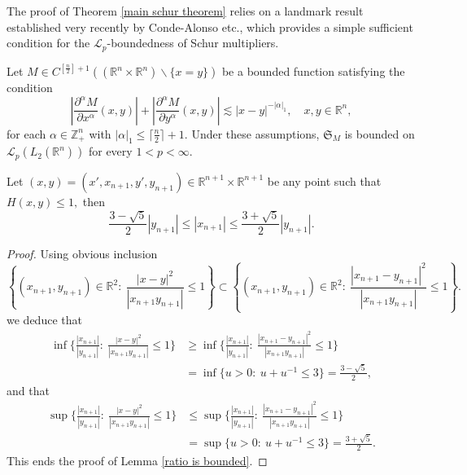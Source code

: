 \documentclass{amsart}
\begin{document}
The proof of Theorem \ref{main schur theorem} relies on a landmark result established very recently by Conde-Alonso etc., which provides a simple sufficient condition for the $\mathcal{L}_p$-boundedness of Schur multipliers.
\begin{theorem}\cite[Theorem A]{MR4660138}\label{Annalspaper}
Let $M\in C^{[\frac{n}{2}]+1}((\mathbb{R}^n\times\mathbb{R}^n)\backslash\{x=y\})$ be a bounded function satisfying the condition
$$\left|\frac{\partial^\alpha M}{\partial x^\alpha}(x,y)\right|+\left|\frac{\partial^\alpha M}{\partial y^\alpha}(x,y)\right|\lesssim |x-y|^{-|\alpha|_1},\quad x,y\in\mathbb{R}^n,$$
for each $\alpha\in\mathbb{Z}_+^n$ with $|\alpha|_1\leq \lceil\frac{n}{2}\rceil+1.$ Under these assumptions, $\mathfrak{S}_M$ is bounded on $\mathcal{L}_p(L_2(\mathbb{R}^n))$ for every $1<p<\infty.$
\end{theorem}

\begin{lemma}\label{ratio is bounded}
Let $(x,y)=(x',x_{n+1},y',y_{n+1})\in\mathbb{R}^{n+1}\times \mathbb{R}^{n+1}$ be any point such that $H(x,y)\leq 1,$ then
$$\frac{3-\sqrt{5}}{2}|y_{n+1}|\leq |x_{n+1}|\leq \frac{3+\sqrt{5}}{2}|y_{n+1}|.$$	
\end{lemma}
\begin{proof} Using obvious inclusion
$$\left\{(x_{n+1},y_{n+1})\in\mathbb{R}^2:\ \frac{|x-y|^2}{|x_{n+1}y_{n+1}|}\leq 1\right\}\subset \left\{(x_{n+1},y_{n+1})\in\mathbb{R}^2:\ \frac{|x_{n+1}-y_{n+1}|^2}{|x_{n+1}y_{n+1}|}\leq 1\right\}.$$
we deduce that
\begin{align*}
\inf\Big\{\frac{|x_{n+1}|}{|y_{n+1}|}:\ \frac{|x-y|^2}{|x_{n+1}y_{n+1}|}\leq 1\Big\}&\geq\inf\Big\{\frac{|x_{n+1}|}{|y_{n+1}|}:\ \frac{|x_{n+1}-y_{n+1}|^2}{|x_{n+1}y_{n+1}|}\leq 1\Big\}\\
&=\inf\{u>0:\ u+u^{-1}\leq 3\}=\frac{3-\sqrt{5}}{2},
\end{align*}
and that
\begin{align*}
\sup\Big\{\frac{|x_{n+1}|}{|y_{n+1}|}:\ \frac{|x-y|^2}{|x_{n+1}y_{n+1}|}\leq 1\Big\}&\leq\sup\Big\{\frac{|x_{n+1}|}{|y_{n+1}|}:\ \frac{|x_{n+1}-y_{n+1}|^2}{|x_{n+1}y_{n+1}|}\leq 1\Big\}\\
&=\sup\{u>0:\ u+u^{-1}\leq 3\}=\frac{3+\sqrt{5}}{2}.
\end{align*}
This ends the proof of Lemma \ref{ratio is bounded}.
\end{proof}
\end{document}
